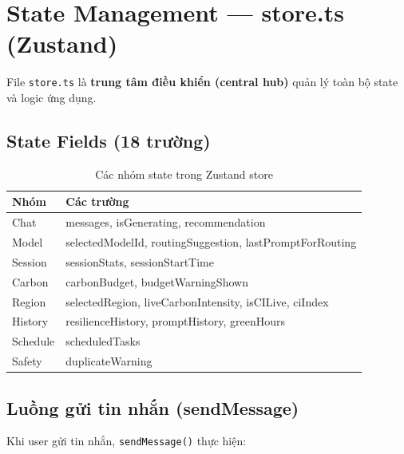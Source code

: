 \documentclass[12pt,a4paper]{article}
\begin{document}
\section{State Management — store.ts (Zustand)}

File \texttt{store.ts} là \textbf{trung tâm điều khiển (central hub)} quản lý toàn bộ state và logic ứng dụng.

\subsection{State Fields (18 trường)}

\begin{table}[h]
    \centering
    \begin{tabular}{lp{8cm}}
        \toprule
        \textbf{Nhóm} & \textbf{Các trường} \\
        \midrule
        Chat & messages, isGenerating, recommendation \\
        Model & selectedModelId, routingSuggestion, lastPromptForRouting \\
        Session & sessionStats, sessionStartTime \\
        Carbon & carbonBudget, budgetWarningShown \\
        Region & selectedRegion, liveCarbonIntensity, isCILive, ciIndex \\
        History & resilienceHistory, promptHistory, greenHours \\
        Schedule & scheduledTasks \\
        Safety & duplicateWarning \\
        \bottomrule
    \end{tabular}
    \caption{Các nhóm state trong Zustand store}
\end{table}

\subsection{Luồng gửi tin nhắn (sendMessage)}

Khi user gửi tin nhắn, \texttt{sendMessage()} thực hiện:
\end{document}
